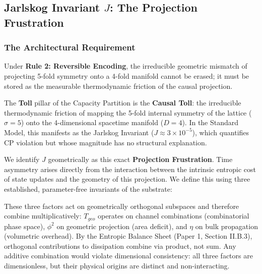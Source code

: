 \subsection{Jarlskog Invariant \texorpdfstring{$J$}{J}: The Projection Frustration}
\label{subsec:jarlskog}


\subsubsection{The Architectural Requirement}
Under \textbf{Rule 2: Reversible Encoding}, the irreducible geometric mismatch of projecting 5-fold symmetry onto a 4-fold manifold cannot be erased; it must be stored as the measurable thermodynamic friction of the causal projection.

The \textbf{Toll} pillar of the Capacity Partition is the \textbf{Causal Toll}: the irreducible thermodynamic friction of mapping the 5-fold internal symmetry of the lattice ($\sigma=5$) onto the 4-dimensional spacetime manifold ($D=4$). In the Standard Model, this manifests as the Jarlskog Invariant ($J \approx 3 \times 10^{-5}$), which quantifies CP violation but whose magnitude has no structural explanation.

We identify $J$ geometrically as this exact \textbf{Projection Frustration}. Time asymmetry arises directly from the interaction between the intrinsic entropic cost of state updates and the geometry of this projection. We define this using three established, parameter-free invariants of the substrate:

These three factors act on geometrically orthogonal subspaces and therefore combine multiplicatively: $T_{geo}$ operates on channel combinations (combinatorial phase space), $\phi^2$ on geometric projection (area deficit), and $\eta$ on bulk propagation (volumetric overhead). By the Entropic Balance Sheet (Paper 1, Section II.B.3), orthogonal contributions to dissipation combine via product, not sum. Any additive combination would violate dimensional consistency: all three factors are dimensionless, but their physical origins are distinct and non-interacting.

